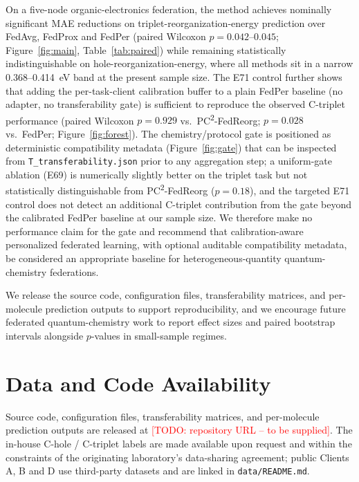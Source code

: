 \documentclass[11pt,a4paper]{article}
\newcommand{\PC}{PC\textsuperscript{2}-FedReorg}
\newcommand{\TODO}[1]{\textcolor{red}{\textsf{[TODO: #1]}}}
\begin{document}
On a five-node organic-electronics federation, the method achieves nominally significant MAE reductions on triplet-reorganization-energy prediction over FedAvg, FedProx and FedPer (paired Wilcoxon $p = 0.042$--$0.045$; Figure~\ref{fig:main}, Table~\ref{tab:paired}) while remaining statistically indistinguishable on hole-reorganization-energy, where all methods sit in a narrow \SI{0.368}{}--\SI{0.414}{\eV} band at the present sample size. The E71 control further shows that adding the per-task-client calibration buffer to a plain FedPer baseline (no adapter, no transferability gate) is sufficient to reproduce the observed C-triplet performance (paired Wilcoxon $p = 0.929$ vs.\ \PC{}; $p = 0.028$ vs.\ FedPer; Figure~\ref{fig:forest}). The chemistry/protocol gate is positioned as deterministic compatibility metadata (Figure~\ref{fig:gate}) that can be inspected from \texttt{T\_transferability.json} prior to any aggregation step; a uniform-gate ablation (E69) is numerically slightly better on the triplet task but not statistically distinguishable from \PC{} ($p = 0.18$), and the targeted E71 control does not detect an additional C-triplet contribution from the gate beyond the calibrated FedPer baseline at our sample size. We therefore make no performance claim for the gate and recommend that calibration-aware personalized federated learning, with optional auditable compatibility metadata, be considered an appropriate baseline for heterogeneous-quantity quantum-chemistry federations.

We release the source code, configuration files, transferability matrices, and per-molecule prediction outputs to support reproducibility, and we encourage future federated quantum-chemistry work to report effect sizes and paired bootstrap intervals alongside $p$-values in small-sample regimes.

\section*{Data and Code Availability}
Source code, configuration files, transferability matrices, and per-molecule prediction outputs are released at \TODO{repository URL -- to be supplied}. The in-house C-hole / C-triplet labels are made available upon request and within the constraints of the originating laboratory's data-sharing agreement; public Clients A, B and D use third-party datasets and are linked in \texttt{data/README.md}.
\end{document}
